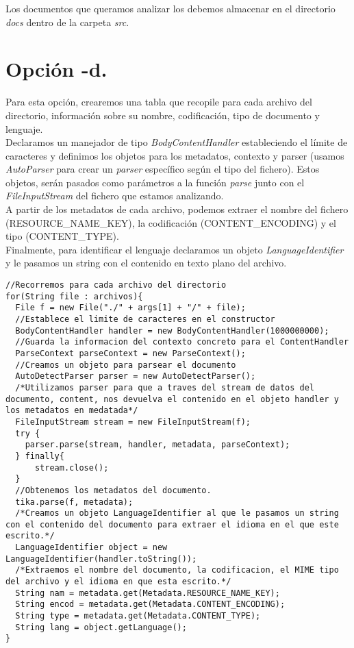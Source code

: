 \documentclass[12pt]{article}
\begin{document}
Los documentos que queramos analizar los debemos almacenar en el directorio \textit{docs} dentro de la carpeta \textit{src}.

\section{Opción \textbf{-d}.}

Para esta opción, crearemos una tabla que recopile para cada archivo del directorio, información sobre su nombre, codificación, tipo de documento y lenguaje.\\

Declaramos un manejador de tipo \textit{BodyContentHandler} estableciendo el límite de caracteres y definimos los objetos para los metadatos, contexto y parser (usamos \textit{AutoParser} para crear un \textit{parser} específico según el tipo del fichero). Estos objetos, serán pasados como parámetros a la función \textit{parse} junto con el \textit{FileInputStream} del fichero que estamos analizando.\\ 

A partir de los metadatos de cada archivo, podemos extraer el nombre del fichero (RESOURCE\_NAME\_KEY), la codificación (CONTENT\_ENCODING) y el tipo (CONTENT\_TYPE).\cite{Guion}\\

Finalmente, para identificar el lenguaje declaramos un objeto \textit{LanguageIdentifier} y le pasamos un string con el contenido en texto plano del archivo.\\

\begin{lstlisting}
//Recorremos para cada archivo del directorio
for(String file : archivos){
  File f = new File("./" + args[1] + "/" + file);
  //Establece el limite de caracteres en el constructor
  BodyContentHandler handler = new BodyContentHandler(1000000000);
  //Guarda la informacion del contexto concreto para el ContentHandler
  ParseContext parseContext = new ParseContext();
  //Creamos un objeto para parsear el documento
  AutoDetectParser parser = new AutoDetectParser();
  /*Utilizamos parser para que a traves del stream de datos del documento, content, nos devuelva el contenido en el objeto handler y los metadatos en medatada*/
  FileInputStream stream = new FileInputStream(f);
  try {
    parser.parse(stream, handler, metadata, parseContext);
  } finally{
      stream.close();
  }
  //Obtenemos los metadatos del documento.
  tika.parse(f, metadata);
  /*Creamos un objeto LanguageIdentifier al que le pasamos un string con el contenido del documento para extraer el idioma en el que este escrito.*/
  LanguageIdentifier object = new LanguageIdentifier(handler.toString());
  /*Extraemos el nombre del documento, la codificacion, el MIME tipo del archivo y el idioma en que esta escrito.*/
  String nam = metadata.get(Metadata.RESOURCE_NAME_KEY);
  String encod = metadata.get(Metadata.CONTENT_ENCODING);
  String type = metadata.get(Metadata.CONTENT_TYPE);
  String lang = object.getLanguage();
}
\end{lstlisting}\
\end{document}
